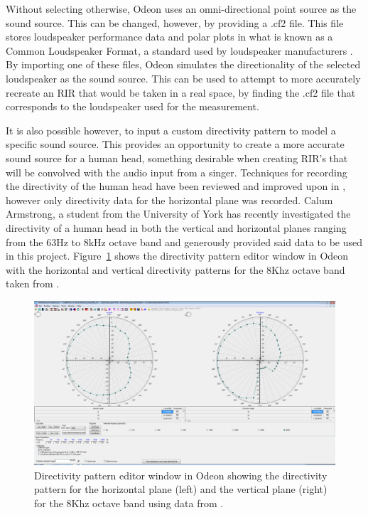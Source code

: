 \documentclass[../../main.tex]{subfiles}
\begin{document}
				Without selecting otherwise, Odeon uses an omni-directional point source as the sound source. This can be changed, however, by providing a .cf2 file. This file stores loudspeaker performance data and polar plots in what is known as a Common Loudspeaker Format, a standard used by loudspeaker manufacturers \cite{clf}. By importing one of these files, Odeon simulates the directionality of the selected loudspeaker as the sound source. This can be used to attempt to more accurately recreate an \ac{RIR} that would be taken in a real space, by finding the .cf2 file that corresponds to the loudspeaker used for the measurement.

				It is also possible however, to input a custom directivity pattern to model a specific sound source. This provides an opportunity to create a more accurate sound source for a human head, something desirable when creating \ac{RIR}'s that will be convolved with the audio input from a singer. Techniques for recording the directivity of the human head have been reviewed and improved upon in \cite{Monson2012b}, however only directivity data for the horizontal plane was recorded. Calum Armstrong, a student from the University of York has recently investigated the directivity of a human head in both the vertical and horizontal planes ranging from the 63Hz to 8kHz octave band \cite{calum} and generously provided said data to be used in this project. Figure~\ref{directivity} shows the directivity pattern editor window in Odeon with the horizontal and vertical directivity patterns for the 8Khz octave band taken from \cite{calum}. 


				\begin{figure}[H]
					\centerline{\includegraphics[scale = 0.3]{Sections/Implementation/Odeon/images/Directivity/DirectivityPattern.png}}
					\caption{Directivity pattern editor window in Odeon showing the directivity pattern for the horizontal plane (left) and the vertical plane (right) for the 8Khz octave band using data from \cite{calum}.}
					\label{directivity}
				\end{figure}
\end{document}
